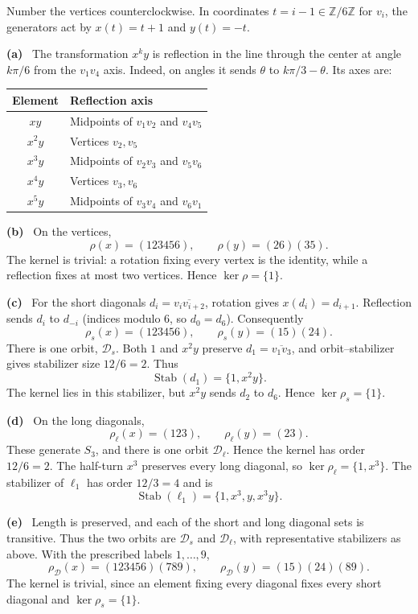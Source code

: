 \documentclass[11pt]{article}
\newcommand{\partlabel}[1]{\par\textbf{(#1)}\ }
\newcommand{\Z}{\mathbb Z}
\newcommand{\Stab}{\operatorname{Stab}}
\begin{document}
\begin{solution}
Number the vertices counterclockwise. In coordinates $t=i-1\in\Z/6\Z$ for $v_i$, the generators act by $x(t)=t+1$ and $y(t)=-t$.
\partlabel{a} The transformation $x^ky$ is reflection in the line through the center at angle $k\pi/6$ from the $v_1v_4$ axis. Indeed, on angles it sends $\theta$ to $k\pi/3-\theta$. Its axes are:
\begin{center}
\begin{tabular}{c|l}
Element & Reflection axis\\ \hline
$xy$ & Midpoints of $v_1v_2$ and $v_4v_5$\\
$x^2y$ & Vertices $v_2,v_5$\\
$x^3y$ & Midpoints of $v_2v_3$ and $v_5v_6$\\
$x^4y$ & Vertices $v_3,v_6$\\
$x^5y$ & Midpoints of $v_3v_4$ and $v_6v_1$
\end{tabular}
\end{center}
\partlabel{b} On the vertices,
\[
 \rho(x)=(123456),\qquad \rho(y)=(26)(35).
\]
The kernel is trivial: a rotation fixing every vertex is the identity, while a reflection fixes at most two vertices. Hence $\ker\rho=\{1\}$.
\partlabel{c} For the short diagonals $d_i=\overline{v_i v_{i+2}}$, rotation gives $x(d_i)=d_{i+1}$. Reflection sends $d_i$ to $d_{-i}$ (indices modulo $6$, so $d_0=d_6$). Consequently
\[
 \rho_s(x)=(123456),\qquad \rho_s(y)=(15)(24).
\]
There is one orbit, $\mathcal D_s$. Both $1$ and $x^2y$ preserve $d_1=\overline{v_1v_3}$, and orbit--stabilizer gives stabilizer size $12/6=2$. Thus
\[
 \Stab(d_1)=\{1,x^2y\}.
\]
The kernel lies in this stabilizer, but $x^2y$ sends $d_2$ to $d_6$. Hence $\ker\rho_s=\{1\}$.
\partlabel{d} On the long diagonals,
\[
 \rho_\ell(x)=(123),\qquad \rho_\ell(y)=(23).
\]
These generate $S_3$, and there is one orbit $\mathcal D_\ell$. Hence the kernel has order $12/6=2$. The half-turn $x^3$ preserves every long diagonal, so $\ker\rho_\ell=\{1,x^3\}$. The stabilizer of $\ell_1$ has order $12/3=4$ and is
\[
 \Stab(\ell_1)=\{1,x^3,y,x^3y\}.
\]
\partlabel{e} Length is preserved, and each of the short and long diagonal sets is transitive. Thus the two orbits are $\mathcal D_s$ and $\mathcal D_\ell$, with representative stabilizers as above. With the prescribed labels $1,\ldots,9$,
\[
 \rho_{\mathcal D}(x)=(123456)(789),\qquad
 \rho_{\mathcal D}(y)=(15)(24)(89).
\]
The kernel is trivial, since an element fixing every diagonal fixes every short diagonal and $\ker\rho_s=\{1\}$.
\end{solution}
\end{document}
